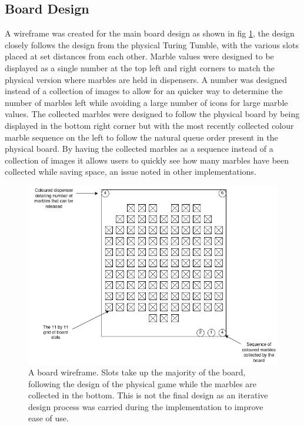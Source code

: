 \documentclass{l4proj}
\begin{document}
\subsection{Board Design}
A wireframe was created for the main board design as shown in fig \ref{fig:boardWireframe}, the design closely follows the design from the physical Turing Tumble, with the various slots placed at set distances from each other. Marble values were designed to be displayed as a single number at the top left and right corners to match the physical version where marbles are held in dispensers. A number was designed instead of a collection of images to allow for an quicker way to determine the number of marbles left while avoiding a large number of icons for large marble values. The collected marbles were designed to follow the physical board by being displayed in the bottom right corner but with the most recently collected colour marble sequence on the left to follow the natural queue order present in the physical board. By having the collected marbles as a sequence instead of a collection of images it allows users to quickly see how many marbles have been collected while saving space, an issue noted in other implementations.

\begin{figure}
    \centering
    \includegraphics[width=0.7\linewidth]{images/boardWireframe.png}
    \caption{A board wireframe. Slots take up the majority of the board, following the design of the physical game while the marbles are collected in the bottom. This is not the final design as an iterative design process was carried during the implementation to improve ease of use.}
    \label{fig:boardWireframe}
\end{figure}
\end{document}
